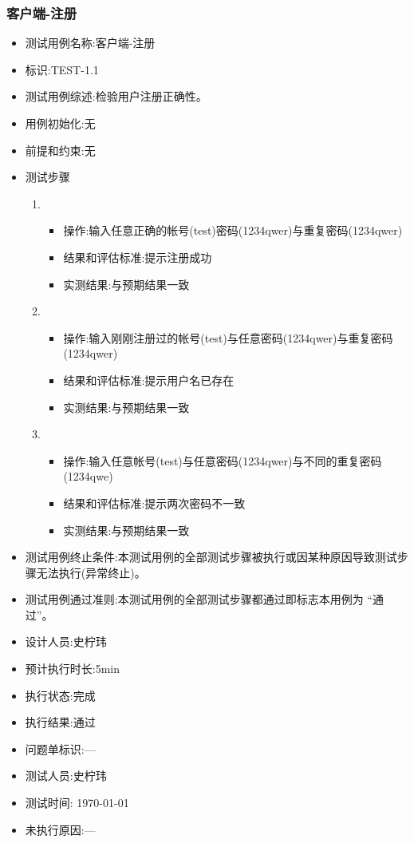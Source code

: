 \documentclass{article}
\begin{document}
\subsubsection{客户端-注册}
\begin{itemize}
\item 测试用例名称:客户端-注册
\item 标识:TEST-1.1
\item 测试用例综述:检验用户注册正确性。
\item 用例初始化:无
\item 前提和约束:无
\item 测试步骤
  \begin{enumerate}
  \item
    \begin{itemize}
    \item 操作:输入任意正确的帐号(test)密码(1234qwer)与重复密码(1234qwer)
    \item 结果和评估标准:提示注册成功
    \item 实测结果:与预期结果一致
    \end{itemize}
  \item
    \begin{itemize}
    \item 操作:输入刚刚注册过的帐号(test)与任意密码(1234qwer)与重复密码(1234qwer)
    \item 结果和评估标准:提示用户名已存在
    \item 实测结果:与预期结果一致
    \end{itemize}
  \item
    \begin{itemize}
    \item 操作:输入任意帐号(test)与任意密码(1234qwer)与不同的重复密码(1234qwe)
    \item 结果和评估标准:提示两次密码不一致
    \item 实测结果:与预期结果一致
    \end{itemize}
  \end{enumerate}
\item 测试用例终止条件:本测试用例的全部测试步骤被执行或因某种原因导致测试步骤无法执行(异常终止)。
\item 测试用例通过准则:本测试用例的全部测试步骤都通过即标志本用例为 “通过”。
\item 设计人员:史柠玮
\item 预计执行时长:5min
\item 执行状态:完成
\item 执行结果:通过
\item 问题单标识:---
\item 测试人员:史柠玮
\item 测试时间: \today
\item 未执行原因:---
\end{itemize}
\end{document}
